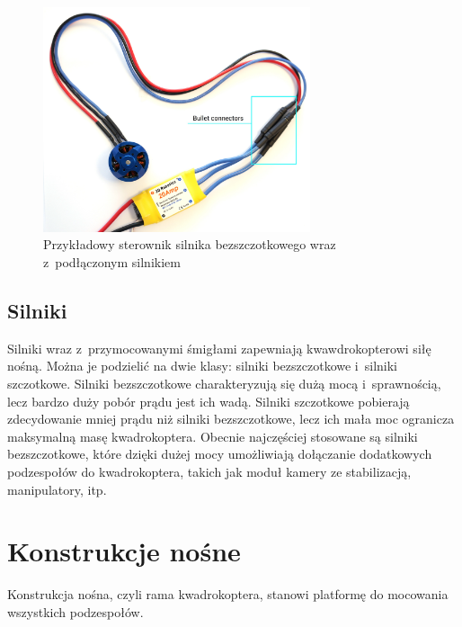 \documentclass[11pt, twoside]{Thesis} %
\begin{document}
\begin{figure}[H]
	\centering
		\includegraphics[width=0.7\textwidth]{Pictures/esc-motor-connect.jpg}
	\caption[Przykładowy sterownik silnika bezszczotkowego]{Przykładowy sterownik silnika bezszczotkowego wraz z~podłączonym silnikiem~\cite{quadro20}}
	\label{fig:esc-motor-connect.jpg}
\end{figure}


\subsection{Silniki}

Silniki wraz z~przymocowanymi śmigłami zapewniają kwawdrokopterowi siłę nośną. Można je podzielić na dwie klasy: silniki bezszczotkowe i~silniki szczotkowe. Silniki bezszczotkowe charakteryzują się dużą mocą i~sprawnością, lecz bardzo duży pobór prądu jest ich wadą. Silniki szczotkowe pobierają zdecydowanie mniej prądu niż silniki bezszczotkowe, lecz ich mała moc ogranicza maksymalną masę kwadrokoptera. Obecnie najczęściej stosowane są silniki bezszczotkowe, które dzięki dużej mocy umożliwiają dołączanie dodatkowych podzespołów do kwadrokoptera, takich jak moduł kamery ze stabilizacją, manipulatory, itp.


\section{Konstrukcje nośne}

Konstrukcja nośna, czyli rama kwadrokoptera, stanowi platformę do mocowania wszystkich podzespołów. 
\end{document}

